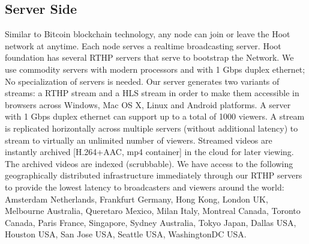 \subsection{Server Side}
Similar to Bitcoin blockchain technology, any node can join or leave the Hoot network at anytime. Each node serves a realtime broadcasting server.
Hoot foundation has several RTHP servers that serve to bootstrap the Network. We use commodity servers with modern processors and with 1 Gbps duplex ethernet;
No specialization of servers is needed. Our server generates two variants of streams: a RTHP stream and a HLS stream in order to make them accessible in browsers across Windows, Mac OS X, Linux and Android platforms. A server with 1 Gbps duplex ethernet can support up to a total of 1000 viewers. A stream is replicated horizontally across multiple servers (without additional latency) to stream to virtually an unlimited number of viewers. 
Streamed videos are instantly archived [H.264+AAC, mp4 container] in the cloud for later viewing. The archived videos are indexed (scrubbable). We have access to the following geographically distributed infrastructure immediately through our RTHP servers to provide the lowest latency to broadcasters and viewers around the world: Amsterdam Netherlands, Frankfurt Germany, Hong Kong, London UK, Melbourne Australia, Queretaro Mexico, Milan Italy, Montreal Canada, Toronto Canada, Paris France, Singapore, Sydney Australia, Tokyo Japan, Dallas USA, Houston USA, San Jose USA, Seattle USA, WashingtonDC USA.

